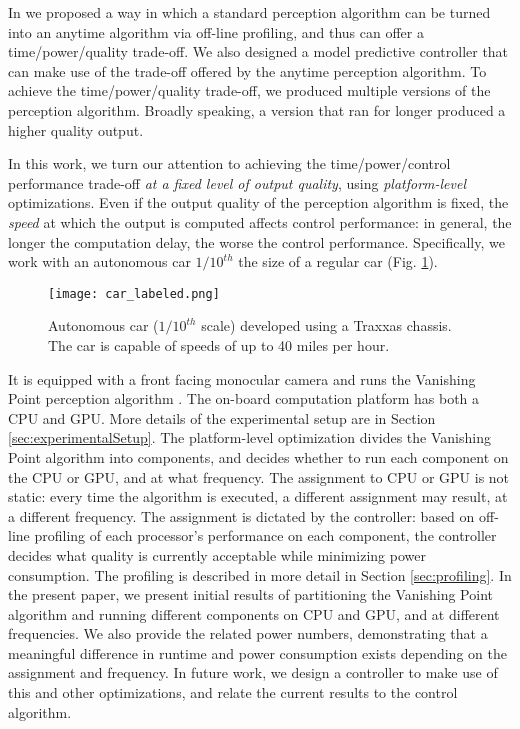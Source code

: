 In \cite{RTSS15} we proposed a way in which a standard perception algorithm can be turned into an anytime algorithm via off-line profiling, and thus can offer a time/power/quality trade-off.
We also designed a model predictive controller that can make use of the trade-off offered by the anytime perception algorithm.
To achieve the time/power/quality trade-off, we produced multiple versions of the perception algorithm.
Broadly speaking, a version that ran for longer produced a higher quality output. 

In this work, we turn our attention to achieving the time/power/control performance trade-off \emph{at a fixed level of output quality}, using \emph{platform-level} optimizations.
Even if the output quality of the perception algorithm is fixed, the \emph{speed} at which the output is computed affects control performance: in general, the longer the computation delay, the worse the control performance.
Specifically, we work with an autonomous car $1/10^{th}$ the size of a regular car (Fig. \ref{fig:traxxas}).
\begin{figure}[t]
	\centering
	\texttt{[image: car\_labeled.png]}
	\caption{Autonomous car ($1/10^{th}$ scale) developed using a Traxxas chassis. The car is capable of speeds of up to 40 miles per hour.}
		\label{fig:traxxas}
\end{figure}  
It is equipped with a front facing monocular camera and runs the Vanishing Point perception algorithm \cite{VP1}. 
The on-board computation platform has both a CPU and GPU. 
More details of the experimental setup are in Section \ref{sec:experimentalSetup}.
The platform-level optimization divides the Vanishing Point algorithm into components, and decides whether to run each component on the CPU or GPU, and at what frequency.
The assignment to CPU or GPU is not static: every time the algorithm is executed, a different assignment may result, at a different frequency.
The assignment is dictated by the controller: based on off-line profiling of each processor's performance on each component, the controller decides what quality is currently acceptable while minimizing power consumption. 
The profiling is described in more detail in Section \ref{sec:profiling}.
In the present paper, we present initial results of partitioning the Vanishing Point algorithm and running different components on CPU and GPU, and at different frequencies.
We also provide the related power numbers, demonstrating that a meaningful difference in runtime and power consumption exists depending on the assignment and frequency.
In future work, we design a controller to make use of this and other optimizations, and relate the current results to the control algorithm.

